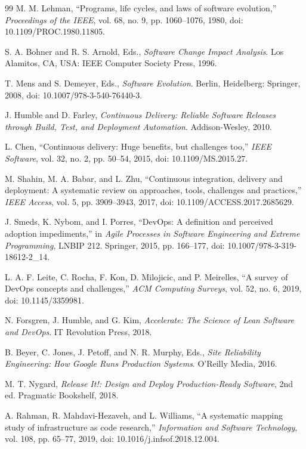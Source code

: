 \documentclass[10pt,journal]{IEEEtran}
\begin{document}
\begin{thebibliography}{99}
M. M. Lehman, ``Programs, life cycles, and laws of software evolution,'' \emph{Proceedings of the IEEE}, vol. 68, no. 9, pp. 1060--1076, 1980, doi: 10.1109/PROC.1980.11805.

S. A. Bohner and R. S. Arnold, Eds., \emph{Software Change Impact Analysis}. Los Alamitos, CA, USA: IEEE Computer Society Press, 1996.

T. Mens and S. Demeyer, Eds., \emph{Software Evolution}. Berlin, Heidelberg: Springer, 2008, doi: 10.1007/978-3-540-76440-3.

J. Humble and D. Farley, \emph{Continuous Delivery: Reliable Software Releases through Build, Test, and Deployment Automation}. Addison-Wesley, 2010.

L. Chen, ``Continuous delivery: Huge benefits, but challenges too,'' \emph{IEEE Software}, vol. 32, no. 2, pp. 50--54, 2015, doi: 10.1109/MS.2015.27.

M. Shahin, M. A. Babar, and L. Zhu, ``Continuous integration, delivery and deployment: A systematic review on approaches, tools, challenges and practices,'' \emph{IEEE Access}, vol. 5, pp. 3909--3943, 2017, doi: 10.1109/ACCESS.2017.2685629.

J. Smeds, K. Nybom, and I. Porres, ``DevOps: A definition and perceived adoption impediments,'' in \emph{Agile Processes in Software Engineering and Extreme Programming}, LNBIP 212. Springer, 2015, pp. 166--177, doi: 10.1007/978-3-319-18612-2\_14.

L. A. F. Leite, C. Rocha, F. Kon, D. Milojicic, and P. Meirelles, ``A survey of DevOps concepts and challenges,'' \emph{ACM Computing Surveys}, vol. 52, no. 6, 2019, doi: 10.1145/3359981.

N. Forsgren, J. Humble, and G. Kim, \emph{Accelerate: The Science of Lean Software and DevOps}. IT Revolution Press, 2018.

B. Beyer, C. Jones, J. Petoff, and N. R. Murphy, Eds., \emph{Site Reliability Engineering: How Google Runs Production Systems}. O'Reilly Media, 2016.

M. T. Nygard, \emph{Release It!: Design and Deploy Production-Ready Software}, 2nd ed. Pragmatic Bookshelf, 2018.

A. Rahman, R. Mahdavi-Hezaveh, and L. Williams, ``A systematic mapping study of infrastructure as code research,'' \emph{Information and Software Technology}, vol. 108, pp. 65--77, 2019, doi: 10.1016/j.infsof.2018.12.004.


\end{thebibliography}
\end{document}
